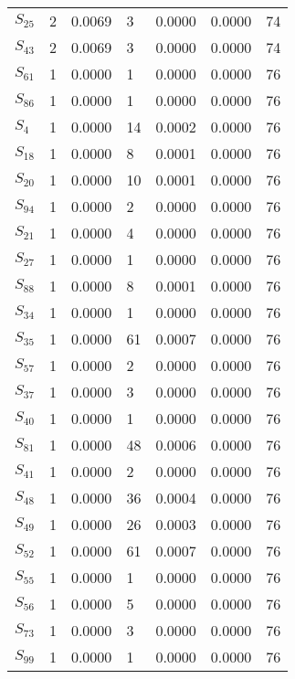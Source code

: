 \begin{xltabular}{\textwidth}{XXXXXXX}
  $S_{25}$ & 2 & 0.0069 & 3 & 0.0000 & 0.0000 & 74 \\ 
  $S_{43}$ & 2 & 0.0069 & 3 & 0.0000 & 0.0000 & 74 \\ 
  $S_{61}$ & 1 & 0.0000 & 1 & 0.0000 & 0.0000 & 76 \\ 
  $S_{86}$ & 1 & 0.0000 & 1 & 0.0000 & 0.0000 & 76 \\ 
  $S_{4}$ & 1 & 0.0000 & 14 & 0.0002 & 0.0000 & 76 \\ 
  $S_{18}$ & 1 & 0.0000 & 8 & 0.0001 & 0.0000 & 76 \\ 
  $S_{20}$ & 1 & 0.0000 & 10 & 0.0001 & 0.0000 & 76 \\ 
  $S_{94}$ & 1 & 0.0000 & 2 & 0.0000 & 0.0000 & 76 \\ 
  $S_{21}$ & 1 & 0.0000 & 4 & 0.0000 & 0.0000 & 76 \\ 
  $S_{27}$ & 1 & 0.0000 & 1 & 0.0000 & 0.0000 & 76 \\ 
  $S_{88}$ & 1 & 0.0000 & 8 & 0.0001 & 0.0000 & 76 \\ 
  $S_{34}$ & 1 & 0.0000 & 1 & 0.0000 & 0.0000 & 76 \\ 
  $S_{35}$ & 1 & 0.0000 & 61 & 0.0007 & 0.0000 & 76 \\ 
  $S_{57}$ & 1 & 0.0000 & 2 & 0.0000 & 0.0000 & 76 \\ 
  $S_{37}$ & 1 & 0.0000 & 3 & 0.0000 & 0.0000 & 76 \\ 
  $S_{40}$ & 1 & 0.0000 & 1 & 0.0000 & 0.0000 & 76 \\ 
  $S_{81}$ & 1 & 0.0000 & 48 & 0.0006 & 0.0000 & 76 \\ 
  $S_{41}$ & 1 & 0.0000 & 2 & 0.0000 & 0.0000 & 76 \\ 
  $S_{48}$ & 1 & 0.0000 & 36 & 0.0004 & 0.0000 & 76 \\ 
  $S_{49}$ & 1 & 0.0000 & 26 & 0.0003 & 0.0000 & 76 \\ 
  $S_{52}$ & 1 & 0.0000 & 61 & 0.0007 & 0.0000 & 76 \\ 
  $S_{55}$ & 1 & 0.0000 & 1 & 0.0000 & 0.0000 & 76 \\ 
  $S_{56}$ & 1 & 0.0000 & 5 & 0.0000 & 0.0000 & 76 \\ 
  $S_{73}$ & 1 & 0.0000 & 3 & 0.0000 & 0.0000 & 76 \\ 
  $S_{99}$ & 1 & 0.0000 & 1 & 0.0000 & 0.0000 & 76 \\
        \bottomrule
    \end{xltabular}
    